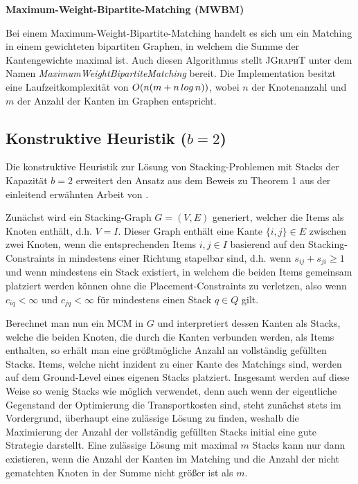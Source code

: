 \textbf{Maximum-Weight-Bipartite-Matching (MWBM)}

Bei einem Maximum-Weight-Bipartite-Matching handelt es sich um ein Matching in einem gewichteten bipartiten Graphen,
in welchem die Summe der Kantengewichte maximal ist. Auch diesen Algorithmus stellt \textsc{JGraphT} \cite{JGraphT}
unter dem Namen \textit{MaximumWeightBipartiteMatching} bereit.
Die Implementation besitzt eine Laufzeitkomplexität von $O(n (m + n \thinspace log \thinspace n))$, wobei $n$ der Knotenanzahl
und $m$ der Anzahl der Kanten im Graphen entspricht.

\subsection{Konstruktive Heuristik ($b = 2$)}
\label{sec:two_cap_heuristic}

Die konstruktive Heuristik zur Lösung von Stacking-Problemen mit Stacks der Kapazität $b=2$ erweitert den Ansatz aus dem Beweis
zu Theorem 1 aus der einleitend erwähnten Arbeit von \citet{Bruns2015}.

Zunächst wird ein Stacking-Graph $G = (V, E)$ generiert, welcher die Items als Knoten enthält, d.h. $V = I$. Dieser Graph
enthält eine Kante $\{i, j\} \in E$ zwischen zwei Knoten, wenn die entsprechenden Items $i, j \in I$ basierend auf den Stacking-Constraints
in mindestens einer Richtung stapelbar sind, d.h. wenn $s_{ij} + s_{ji} \geq 1$ und wenn mindestens ein Stack existiert, in welchem die beiden Items gemeinsam platziert werden können ohne die Placement-Constraints zu verletzen, also wenn $c_{iq} < \infty$ und $c_{jq} < \infty$ für
mindestens einen Stack $q \in Q$ gilt.

Berechnet man nun ein \textsc{MCM} in $G$ und interpretiert dessen Kanten als Stacks, welche die beiden Knoten, die durch
die Kanten verbunden werden, als Items enthalten, so erhält man eine größtmögliche Anzahl an vollständig gefüllten Stacks.
Items, welche nicht inzident zu einer Kante des Matchings sind, werden auf dem Ground-Level eines eigenen Stacks platziert.
Insgesamt werden auf diese Weise so wenig Stacks wie möglich verwendet, denn auch wenn der eigentliche Gegenstand der Optimierung die Transportkosten sind, steht zunächst stets im Vordergrund, überhaupt eine zulässige Lösung zu finden, weshalb die Maximierung der Anzahl der vollständig gefüllten Stacks initial eine gute Strategie darstellt.
Eine zulässige Lösung mit maximal $m$ Stacks kann nur dann existieren, wenn die Anzahl der Kanten im Matching und die Anzahl der nicht gematchten Knoten in der Summe nicht größer ist als $m$.

